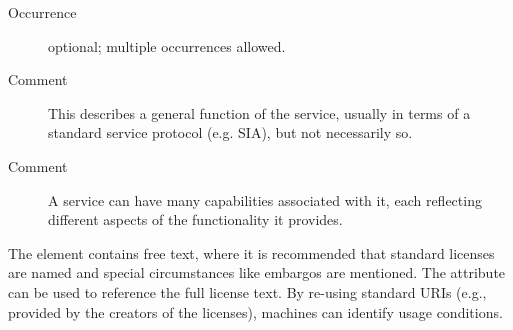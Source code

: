 \documentclass[11pt,a4paper]{ivoa}
\begin{document}
\begin{generated}
\begin{bigdescription}
\begin{description}
\item[Occurrence] optional; multiple occurrences allowed.
\item[Comment] 
                        This describes a general function of the
                        service, usually in terms of a standard
                        service protocol (e.g. SIA), but not
                        necessarily so.
                     
\item[Comment] 
                        A service can have many capabilities
                        associated with it, each reflecting different
                        aspects of the functionality it provides.  
                     

\end{description}


\end{bigdescription}\endgroup

\endgroup
\end{generated}


The  element contains free text, where it is recommended
that standard licenses are named and special circumstances like embargos
are mentioned.  The  attribute can be used to
reference the
full license text.  By re-using standard URIs (e.g., provided by the
creators of the licenses), machines can
identify usage conditions.
\end{document}
